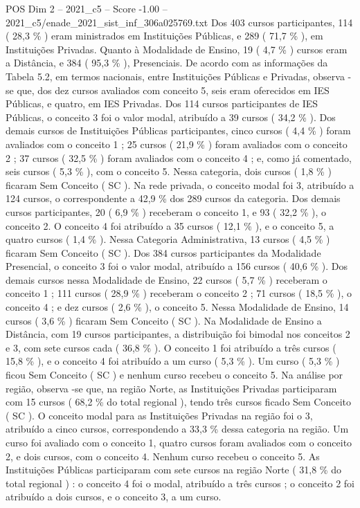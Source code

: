 \begin{textsample}{POS Dim 2 – 2021\_c5 – Score -1.00 – 2021\_c5/enade\_2021\_sist\_inf\_306a025769.txt}
Dos 403 cursos participantes, 114 ( 28,3 \% ) eram ministrados em Instituições Públicas, e 289 ( 71,7 \% ), em Instituições Privadas.
Quanto à Modalidade de Ensino, 19 ( 4,7 \% ) cursos eram a Distância, e 384 ( 95,3 \% ), Presenciais.
De acordo com as informações da Tabela 5.2, em termos nacionais, entre Instituições Públicas e Privadas, observa -se que, dos dez cursos avaliados com conceito 5, seis eram oferecidos em IES Públicas, e quatro, em IES Privadas.
Dos 114 cursos participantes de IES Públicas, o conceito 3 foi o valor modal, atribuído a 39 cursos ( 34,2 \% ).
Dos demais cursos de Instituições Públicas participantes, cinco cursos ( 4,4 \% ) foram avaliados com o conceito 1 ; 25 cursos ( 21,9 \% ) foram avaliados com o conceito 2 ; 37 cursos ( 32,5 \% ) foram avaliados com o conceito 4 ; e, como já comentado, seis cursos ( 5,3 \% ), com o conceito 5.
Nessa categoria, dois cursos ( 1,8 \% ) ficaram Sem Conceito ( SC ).
Na rede privada, o conceito modal foi 3, atribuído a 124 cursos, o correspondente a 42,9 \% dos 289 cursos da categoria.
Dos demais cursos participantes, 20 ( 6,9 \% ) receberam o conceito 1, e 93 ( 32,2 \% ), o conceito 2.
O conceito 4 foi atribuído a 35 cursos ( 12,1 \% ), e o conceito 5, a quatro cursos ( 1,4 \% ).
Nessa Categoria Administrativa, 13 cursos ( 4,5 \% ) ficaram Sem Conceito ( SC ).
Dos 384 cursos participantes da Modalidade Presencial, o conceito 3 foi o valor modal, atribuído a 156 cursos ( 40,6 \% ).
Dos demais cursos nessa Modalidade de Ensino, 22 cursos ( 5,7 \% ) receberam o conceito 1 ; 111 cursos ( 28,9 \% ) receberam o conceito 2 ; 71 cursos ( 18,5 \% ), o conceito 4 ; e dez cursos ( 2,6 \% ), o conceito 5.
Nessa Modalidade de Ensino, 14 cursos ( 3,6 \% ) ficaram Sem Conceito ( SC ).
Na Modalidade de Ensino a Distância, com 19 cursos participantes, a distribuição foi bimodal nos conceitos 2 e 3, com sete cursos cada ( 36,8 \% ).
O conceito 1 foi atribuído a três cursos ( 15,8 \% ), e o conceito 4 foi atribuído a um curso ( 5,3 \% ).
Um curso ( 5,3 \% ) ficou Sem Conceito ( SC ) e nenhum curso recebeu o conceito 5.
Na análise por região, observa -se que, na região Norte, as Instituições Privadas participaram com 15 cursos ( 68,2 \% do total regional ), tendo três cursos ficado Sem Conceito ( SC ).
O conceito modal para as Instituições Privadas na região foi o 3, atribuído a cinco cursos, correspondendo a 33,3 \% dessa categoria na região.
Um curso foi avaliado com o conceito 1, quatro cursos foram avaliados com o conceito 2, e dois cursos, com o conceito 4.
Nenhum curso recebeu o conceito 5.
As Instituições Públicas participaram com sete cursos na região Norte ( 31,8 \% do total regional ) : o conceito 4 foi o modal, atribuído a três cursos ; o conceito 2 foi atribuído a dois cursos, e o conceito 3, a um curso.

\end{textsample}
